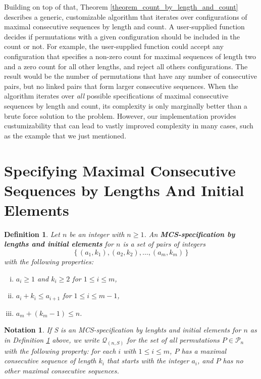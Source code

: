 \documentclass{article}
\newtheorem{definition}[theorem]{Definition}
\newtheorem{notation}[theorem]{Notation}
\begin{document}
Building on top of that, Theorem \ref{theorem_count_by_length_and_count} describes a generic, customizable algorithm
that iterates over configurations of maximal consecutive sequences by length and count.
A user-supplied function decides if permutations with a given configuration should be included in the count or not.
For example, the user-supplied function could accept any configuration that specifies a non-zero count for maximal
sequences of length two and a zero count for all other lengths, and reject all others configurations.
The result would be the number
of permutations that have any number of consecutive pairs, but no linked pairs that form larger
consecutive sequences. When the algorithm iterates over {\it all} possible specifications of maximal
consecutive sequences by length and count, its complexity is only marginally better than a brute force
solution to the problem. However, our implementation provides custumizability that can lead to vastly
improved complexity in many cases, such as the example that we just mentioned.

\section{Specifying Maximal Consecutive Sequences by Lengths And Initial Elements}

\begin{definition} \label{def_mcs_spec_by_length_and_initial_element}
  Let $n$ be an integer with $n\geq 1$. An {\bf MCS-specification by lengths and initial elements} for $n$ is a
  set of pairs of integers $$\{\,(a_1, k_1), (a_2, k_2), \ldots,(a_m, k_m)\,\}$$ with the following properties:
  \begin{enumerate}[(i)]
  \item
    $a_i \geq 1$ and $k_i \geq 2$ for $1\leq i \leq m$,
  \item
    $a_i + k_i \leq a_{i+1}$ for $1\leq i \leq m-1$,
  \item
    $a_m + (k_m-1) \leq n$.
  \end{enumerate}
\end{definition}

\begin{notation}\label{notation_mcs_spec_by_length_and_initial_element}
  If S is an MCS-specification by lenghts and initial elements for $n$ as in
  Definition \ref{def_mcs_spec_by_length_and_initial_element}
  above, we write ${\mathcal Q}_{(n,S)}$ for the set of all permutations
  $P \in {\mathcal P}_n$ with the following property: for each $i$ with $1\leq i \leq m$, $P$ has a maximal
  consecutive sequence of length $k_i$ that starts with the integer $a_i$, and $P$ has no other maximal
  consecutive sequences.
\end{notation}
\end{document}
